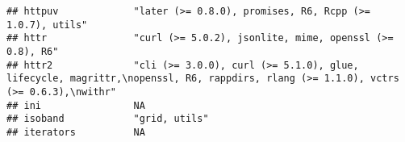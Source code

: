 \documentclass[
]{article}
\begin{document}
\begin{verbatim}
## httpuv             "later (>= 0.8.0), promises, R6, Rcpp (>= 1.0.7), utils"                                                                                                                                                                                                                                                                                                                                                                                     
## httr               "curl (>= 5.0.2), jsonlite, mime, openssl (>= 0.8), R6"                                                                                                                                                                                                                                                                                                                                                                                      
## httr2              "cli (>= 3.0.0), curl (>= 5.1.0), glue, lifecycle, magrittr,\nopenssl, R6, rappdirs, rlang (>= 1.1.0), vctrs (>= 0.6.3),\nwithr"                                                                                                                                                                                                                                                                                                             
## ini                NA                                                                                                                                                                                                                                                                                                                                                                                                                                           
## isoband            "grid, utils"                                                                                                                                                                                                                                                                                                                                                                                                                                
## iterators          NA                                                                                                                                                                                                                                                                                                                                                                                                                                           

\end{verbatim}
\end{document}
